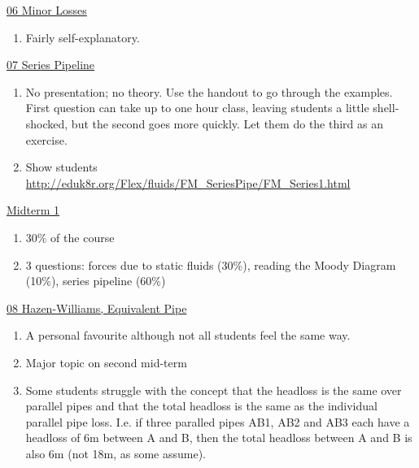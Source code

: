 \documentclass[9pt,oneside]{amsart}
\begin{document}
\underline{06 Minor Losses}
\begin{enumerate}
	\item Fairly self-explanatory.
\end{enumerate}

\underline{07 Series Pipeline}
\begin{enumerate}
	\item No presentation; no theory. Use the handout to go through the examples. First question can take up to one hour class, leaving students a little shell-shocked, but the second goes more quickly. Let them do the third as an exercise.
	\item Show students \url{http://eduk8r.org/Flex/fluids/FM_SeriesPipe/FM_Series1.html}
\end{enumerate}

\underline{Midterm 1}
\begin{enumerate}
	\item 30\% of the course
	\item 3 questions: forces due to static fluids (30\%), reading the Moody Diagram (10\%), series pipeline (60\%)
\end{enumerate}

\underline{08 Hazen-Williams, Equivalent Pipe}
\begin{enumerate}
	\item A personal favourite although not all students feel the same way.
	\item Major topic on second mid-term
	\item Some students struggle with the concept that the headloss is the same over parallel pipes and that the total headloss is the same as the individual parallel pipe loss. I.e. if three paralled pipes AB1, AB2 and AB3 each have a headloss of 6m between A and B, then the total headloss between A and B is also 6m (not 18m, as some assume).
\end{enumerate}
\end{document}
